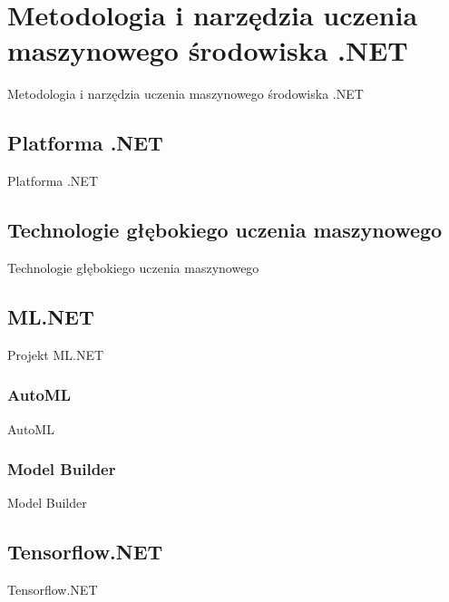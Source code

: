\chapter{Metodologia i narzędzia uczenia maszynowego środowiska .NET}

Metodologia i narzędzia uczenia maszynowego środowiska .NET

\section{Platforma .NET}

Platforma .NET

\section{Technologie głębokiego uczenia maszynowego}

Technologie głębokiego uczenia maszynowego

\section{ML.NET}

Projekt ML.NET

\subsection{AutoML}

AutoML

\subsection{Model Builder}

Model Builder

\section{Tensorflow.NET}

Tensorflow.NET
